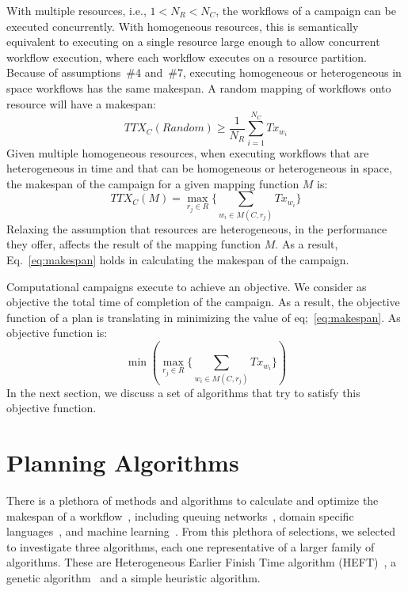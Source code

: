 With multiple resources, i.e., $1 < N_{R} < N_{C}$, the workflows of a campaign can be executed concurrently.
With homogeneous resources, this is semantically equivalent to executing on a single resource large enough to allow concurrent workflow execution, where each workflow executes on a resource partition. 
Because of assumptions~\#4 and~\#7, executing homogeneous or heterogeneous in space workflows has the same makespan.
A random mapping of workflows onto resource will have a makespan:
\begin{equation}
   TTX_{C}(Random) \geq \frac{1}{N_{R}}\sum_{i=1}^{N_{C}} Tx_{w_{i}} 
\end{equation}
Given multiple homogeneous resources, when executing workflows that are heterogeneous in time and that can be homogeneous or heterogeneous in space, the makespan of the campaign for a given mapping function $ M $ is:
\begin{equation}
TTX_{C}(M) = \max_{r_{j}\in R}\Big\{\sum_{w_{i}\in M(C,r_{j})}Tx_{w_{i}}\Big\}
\label{eq:makespan}
\end{equation}
Relaxing the assumption that resources are heterogeneous, in the performance they offer, affects the result of the mapping function $ M $.
As a result, Eq.~\ref{eq:makespan} holds in calculating the makespan of the campaign.

Computational campaigns execute to achieve an objective.
We consider as objective the total time of completion of the campaign.
As a result, the objective function of a plan is translating in minimizing the value of eq;~\ref{eq:makespan}.
As objective function is:
\begin{equation}
    \min(\max_{r_{j}\in R}\Big\{\sum_{w_{i}\in M(C,r_{j})}Tx_{w_{i}}\Big\})
\end{equation}
In the next section, we discuss a set of algorithms that try to satisfy this objective function.

\section{Planning Algorithms}
\label{sec:algo}

There is a plethora of methods and algorithms to calculate and optimize the makespan of a workflow~\cite{lu2019review}, including queuing networks~\cite{yao2019throughput,bao2019performance}, domain specific languages~\cite{carothers2017durango,maheshwari2016workflow}, and machine learning~\cite{witt2019predictive,pumma2017runtime}.
From this plethora of selections, we selected to investigate three algorithms, each one representative of a larger family of algorithms.
These are Heterogeneous Earlier Finish Time algorithm (HEFT)~\cite{topcuoglu2002performance}, a genetic algorithm~\cite{page2005algorithm} and a simple heuristic algorithm.

